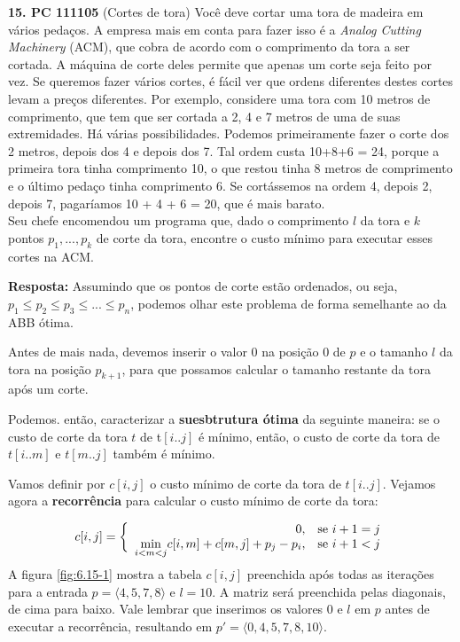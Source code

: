 
\noindent \textbf{15. PC 111105} (Cortes de tora) Você deve cortar uma tora de madeira em vários pedaços. A empresa mais em conta para fazer isso é a \textit{Analog Cutting Machinery} (ACM), que cobra de acordo com o comprimento da tora a ser cortada. A máquina de corte deles permite que apenas um corte seja feito por vez. Se queremos fazer vários cortes, é fácil ver que ordens diferentes destes cortes levam a preços diferentes. Por exemplo, considere uma tora com 10 metros de comprimento, que tem que ser cortada a 2, 4 e 7 metros de uma de suas extremidades. Há várias possibilidades. Podemos
primeiramente fazer o corte dos 2 metros, depois dos 4 e depois dos 7. Tal ordem custa 10+8+6 = 24, porque a primeira tora tinha comprimento 10, o que restou tinha 8 metros de comprimento e o último pedaço tinha comprimento 6. Se cortássemos na ordem 4, depois 2, depois 7, pagaríamos 10 + 4 + 6 = 20, que é mais barato.\\
Seu chefe encomendou um programa que, dado o comprimento $l$ da tora e $k$ pontos $p_1,... , p_k$ de corte da tora, encontre o custo mínimo para executar esses cortes na ACM.

\textbf{Resposta:} Assumindo que os pontos de corte estão ordenados, ou seja, $p_1 \leq p_2 \leq p_3 \leq ... \leq p_n$, podemos olhar este problema de forma semelhante ao da ABB ótima.

Antes de mais nada, devemos inserir o valor $0$ na posição $0$ de $p$ e o tamanho $l$ da tora na posição $p_{k+1}$, para que possamos calcular o tamanho restante da tora após um corte.

Podemos. então, caracterizar a \textbf{suesbtrutura ótima} da seguinte maneira: se o custo de corte da tora $t$ de t$[i..j]$ é mínimo, então, o custo de corte da tora de $t[i..m]$ e $t[m..j]$ também é mínimo.

Vamos definir por $c[i, j]$ o custo mínimo de corte da tora de $t[i..j]$. Vejamos agora a \textbf{recorrência} para calcular o custo mínimo de corte da tora:

\begin{align*}
c[i, j] = \left\{\begin{array}{rl}
                    0, &\mbox{se $i + 1 = j$} \\
                    \smash{\displaystyle\min_{i < m < j}} {c[i, m] + c[m, j]} + p_j - p_i, &\mbox{se $i+1 < j $}
                \end{array} \right.
\end{align*}

A figura \ref{fig:6.15-1} mostra a tabela $c[i, j]$ preenchida após todas as iterações para a entrada $p = \langle 4, 5, 7, 8 \rangle$ e $l = 10$. A matriz será preenchida pelas diagonais, de cima para baixo. Vale lembrar que inserimos os valores 0 e $l$ em $p$ antes de executar a recorrência, resultando em $p' = \langle 0, 4, 5, 7, 8, 10 \rangle$.


